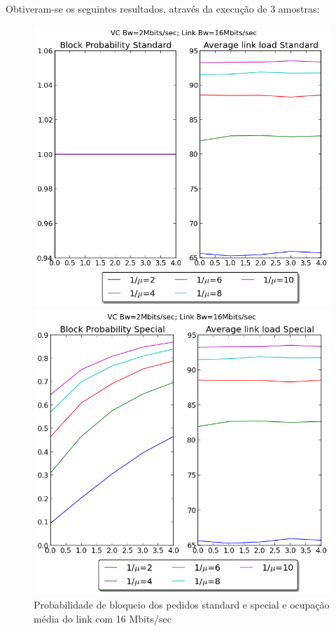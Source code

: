 \documentclass[pdftex,12pt,a4paper]{report}
\begin{document}
Obtiveram-se os seguintes resultados, através da execução de 3 amostras:

\begin{figure}[!htb]
  \centering
  \begin{minipage}[b]{0.4\textwidth}
    \includegraphics[width=\textwidth]{imagensGuia/graphstandard1ex3.png}
  \end{minipage}
  \hfill
  \begin{minipage}[b]{0.4\textwidth}
    \includegraphics[width=\textwidth]{imagensGuia/graphspecial2ex3}
  \end{minipage}
  \caption{Probabilidade de bloqueio dos pedidos standard e special e ocupação média do link com 16 Mbits/sec}
\end{figure}
\end{document}
